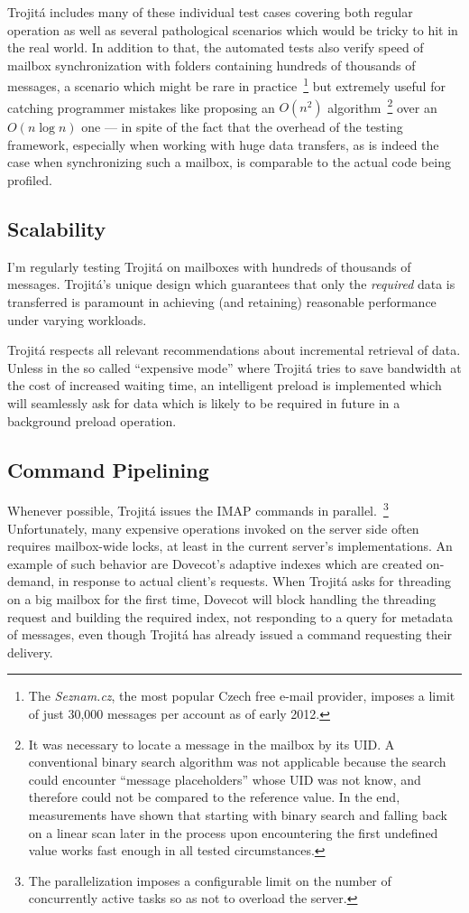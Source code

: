 \documentclass[trojita]{subfiles}
\begin{document}
Trojitá includes many of these individual test cases covering both regular operation as well as several pathological
scenarios which would be tricky to hit in the real world.  In addition to that, the automated tests also verify speed of
mailbox synchronization with folders containing hundreds of thousands of messages, a scenario which might be rare in
practice~\footnote{The {\em Seznam.cz}, the most popular Czech free e-mail provider, imposes a limit of just 30,000
messages per account as of early 2012.} but extremely useful for catching programmer mistakes like proposing an $O(n^2)$
algorithm~\footnote{It was necessary to locate a message in the mailbox by its UID.  A conventional binary search
algorithm was not applicable because the search could encounter ``message placeholders'' whose UID was not know, and
therefore could not be compared to the reference value.  In the end, measurements have shown that starting with binary
search and falling back on a linear scan later in the process upon encountering the first undefined value works fast
enough in all tested circumstances.} over an $O(n \log n)$ one --- in spite of the fact that the overhead of the testing
framework, especially when working with huge data transfers, as is indeed the case when synchronizing such a mailbox, is
comparable to the actual code being profiled.

\subsection{Scalability}

I'm regularly testing Trojitá on mailboxes with hundreds of thousands of messages.  Trojitá's unique design which
guarantees that only the {\em required} data is transferred is paramount in achieving (and retaining) reasonable
performance under varying workloads.

Trojitá respects all relevant recommendations about incremental retrieval of data.  Unless in the so called ``expensive
mode'' where Trojitá tries to save bandwidth at the cost of increased waiting time, an intelligent preload is
implemented which will seamlessly ask for data which is likely to be required in future in a background preload
operation.

\subsection{Command Pipelining}

Whenever possible, Trojitá issues the IMAP commands in parallel.~\footnote{The parallelization imposes a configurable
limit on the number of concurrently active tasks so as not to overload the server.}  Unfortunately, many expensive
operations invoked on the server side often requires mailbox-wide locks, at least in the current server's
implementations.  An example of such behavior are Dovecot's adaptive indexes \cite{dovecot-adaptive-indexes} which are
created on-demand, in response to actual client's requests.  When Trojitá asks for threading on a big mailbox for the
first time, Dovecot will block handling the threading request and building the required index, not responding to a query
for metadata of messages, even though Trojitá has already issued a command requesting their delivery.
\end{document}

